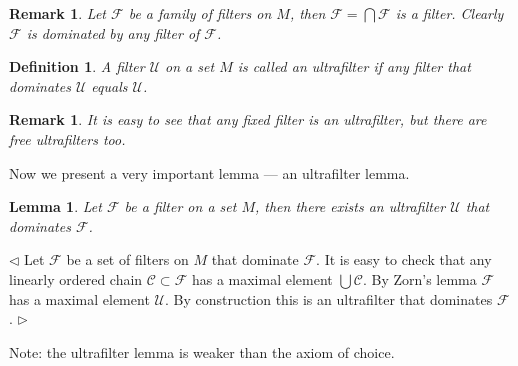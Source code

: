 \documentclass[12pt]{article}
\newtheorem{lemma}[theorem]{Lemma}
\newtheorem{remark}[theorem]{Remark}
\newtheorem{definition}[theorem]{Definition}
\newenvironment{proof}{\par $\triangleleft$}{$\triangleright$}
\begin{document}
\begin{remark} Let $\mathscr{F}$ be a family of filters on $M$, then $\mathcal{F}=\bigcap \mathscr{F}$ is a filter. Clearly $\mathcal{F}$ is dominated by any filter of $\mathscr{F}$.
\end{remark}

\begin{definition}\label{DefUltraFilter} A filter $\mathcal{U}$ on a set $M$ is called an ultrafilter if any filter that dominates $\mathcal{U}$ equals $\mathcal{U}$.
\end{definition}

\begin{remark}\label{RemFixedFilterIsAnUltraFilter} It is easy to see that any fixed filter is an ultrafilter, but there are free ultrafilters too.
\end{remark}

Now we present a very important lemma --- an ultrafilter lemma.

\begin{lemma}\label{LemExistenceOfUltraFilters} Let $\mathcal{F}$ be a filter on a set $M$, then there exists an ultrafilter $\mathcal{U}$ that dominates $\mathcal{F}$.
\end{lemma}
\begin{proof} Let $\mathscr{F}$ be a set of filters on $M$ that dominate $\mathcal{F}$. It is easy to check that any linearly ordered chain $\mathscr{C}\subset \mathscr{F}$ has a maximal element $\bigcup\mathscr{C}$. By Zorn's lemma $\mathscr{F}$ has a maximal element $\mathcal{U}$. By construction this is an ultrafilter that dominates $\mathcal{F}$.
\end{proof}

Note: the ultrafilter lemma is weaker than the axiom of choice.
\end{document}
